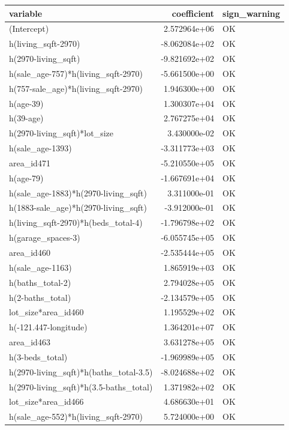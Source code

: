 \documentclass[
]{article}
\begin{document}
{\def\LTcaptype{} %
\begin{longtable}[]{@{}lrl@{}}
\toprule\noalign{}
variable & coefficient & sign\_warning \\
\midrule\noalign{}
\endhead
\bottomrule\noalign{}
\endlastfoot
(Intercept) & 2.572964e+06 & OK \\
h(living\_sqft-2970) & -8.062084e+02 & OK \\
h(2970-living\_sqft) & -9.821692e+02 & OK \\
h(sale\_age-757)*h(living\_sqft-2970) & -5.661500e+00 & OK \\
h(757-sale\_age)*h(living\_sqft-2970) & 1.946300e+00 & OK \\
h(age-39) & 1.300307e+04 & OK \\
h(39-age) & 2.767275e+04 & OK \\
h(2970-living\_sqft)*lot\_size & 3.430000e-02 & OK \\
h(sale\_age-1393) & -3.311773e+03 & OK \\
area\_id471 & -5.210550e+05 & OK \\
h(age-79) & -1.667691e+04 & OK \\
h(sale\_age-1883)*h(2970-living\_sqft) & 3.311000e-01 & OK \\
h(1883-sale\_age)*h(2970-living\_sqft) & -3.912000e-01 & OK \\
h(living\_sqft-2970)*h(beds\_total-4) & -1.796798e+02 & OK \\
h(garage\_spaces-3) & -6.055745e+05 & OK \\
area\_id460 & -2.535444e+05 & OK \\
h(sale\_age-1163) & 1.865919e+03 & OK \\
h(baths\_total-2) & 2.794028e+05 & OK \\
h(2-baths\_total) & -2.134579e+05 & OK \\
lot\_size*area\_id460 & 1.195529e+02 & OK \\
h(-121.447-longitude) & 1.364201e+07 & OK \\
area\_id463 & 3.631278e+05 & OK \\
h(3-beds\_total) & -1.969989e+05 & OK \\
h(2970-living\_sqft)*h(baths\_total-3.5) & -8.024688e+02 & OK \\
h(2970-living\_sqft)*h(3.5-baths\_total) & 1.371982e+02 & OK \\
lot\_size*area\_id466 & 4.686630e+01 & OK \\
h(sale\_age-552)*h(living\_sqft-2970) & 5.724000e+00 & OK \\

\end{longtable}}
\end{document}
